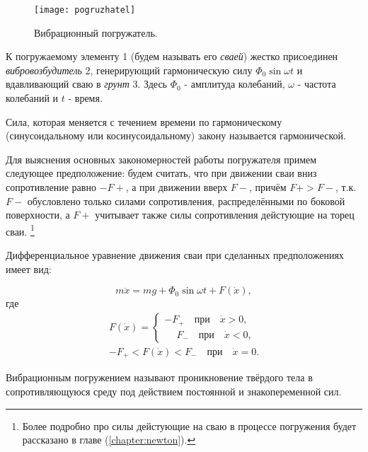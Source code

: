 \begin{figure}[h]
    \centering
    \texttt{[image: pogruzhatel]}
    \caption{Вибрационный погружатель.}
    \label{fig:vp}
\end{figure}

\noindent К погружаемому элементу 1 (будем называть его \textit{сваей}) жестко присоединен \textit{вибровозбудитель} 2,
генерирующий гармоническую силу $\Phi_0 \sin \omega t$ и вдавливающий сваю в \textit{грунт} 3. Здесь $\Phi_0$ - амплитуда
колебаний, $\omega$ - частота колебаний и $t$ - время.

\begin{definition}
    Сила, которая меняется с течением времени по гармоническому (синусоидальному или косинусоидальному)
    закону называется гармонической.
\end{definition}

Для выяснения основных закономерностей работы погружателя примем следующее предположение: будем считать, что
при движении сваи вниз сопротивление равно $-F+$, а при движении вверх $F-$, причём $F+ > F-$, т.к. $F-$ обусловлено только
силами сопротивления, распределёнными по боковой поверхности, а $F+$ учитывает также силы сопротивления дейстующие на
торец сваи. \footnote{Более подробно про силы дейстующие на сваю в процессе погружения будет рассказано
в главе (\ref{chapter:newton}).}

Дифференциальное уравнение движения сваи при сделанных предположениях имеет вид:

\begin{equation}
    m\ddot{x} = mg + \Phi_0 \sin \omega t + F(\dot{x}),
\end{equation}
где
\begin{equation}
    \begin{aligned}
        F(\dot{x}) =
        \begin{cases}
            -F_+ \quad \text{при} \quad \dot{x} > 0,\\
            \phantom{-}F_- \quad \text{при} \quad \dot{x} < 0,
        \end{cases}\\
        -F_+ < F(\dot{x}) < F_- \quad \text{при} \quad \dot{x} = 0.
    \end{aligned}
\end{equation}

\begin{definition}
    Вибрационным погружением называют проникновение твёрдого тела в сопротивляющуюся среду
    под действием постоянной и знакопеременной сил.
\end{definition}

